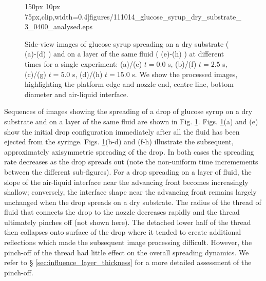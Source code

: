 \documentclass[aip,graphicx]{revtex4-1}
\begin{document}
\begin{figure}[!ht]
{{       150px 10px
       75px},clip,width=0.4\textwidth]{figures/111014_glucose_syrup_dry_substrate_3_0400_analysed.eps}}\addtocounter{subfigure}{+3} \hspace{0.5cm}
  \caption{Side-view images of glucose syrup spreading on a dry
    substrate ( (a)-(d) ) and on a layer of
    the same fluid ( (e)-(h) ) at different times for a single experiment: (a)/(e)
    $t=0.0$ s, (b)/(f) $t=2.5$ s, (c)/(g) $t=5.0$ s, (d)/(h) $t=15.0$
    s. We show the processed images,
    highlighting the platform edge and nozzle end, centre line, bottom
    diameter and air-liquid interface.\label{fig:glucose_spreading}}
\end{figure}

Sequences of images showing the spreading of a drop
of glucose syrup on a dry substrate and on a layer of the same fluid are shown in Fig.
\ref{fig:glucose_spreading}. Figs. \ref{fig:glucose_spreading}(a) and (e)
show the initial drop configuration immediately after all the fluid 
has been ejected from the syringe. Figs. 
\ref{fig:glucose_spreading}(b-d) and (f-h) illustrate the subsequent,
approximately axisymmetric spreading of the drop. In both cases the spreading
rate decreases as the drop spreads out (note the non-uniform time
incremements between the different sub-figures). For a drop spreading
on a layer of fluid, the slope of the air-liquid interface near the 
advancing front  becomes increasingly shallow; conversely, 
the interface shape near the advancing front remains largely 
unchanged when the drop spreads on a dry substrate. The radius 
of the thread of fluid that connects
the drop to the nozzle decreases rapidly and the thread ultimately 
pinches off (not shown here). The detached lower half of the thread 
then collapses onto surface of the drop where it tended to create 
additional reflections which made the subsequent image processing 
difficult. However, the pinch-off of the thread had little effect on the 
overall spreading dynamics. We refer to \S
\ref{sec:influence_layer_thickness} for a more detailed
assessment of the pinch-off.
\end{document}
